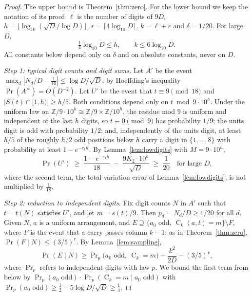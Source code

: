 \documentclass[11pt]{article}
\theoremstyle{definition}
\theoremstyle{remark}
\newcommand{\C}{\operatorname{C}}
\begin{document}
\begin{proof}
The upper bound is Theorem~\ref{thm:zero}. For the lower bound we keep the
notation of its proof: $\ell$ is the number of digits of $9D$,
$h=\lfloor\log_{10}(\sqrt D/\log D)\rfloor$, $r=\lceil4\log_{10}D\rceil$,
$k=\ell+r$ and $\delta=1/20$. For large $D$,
\begin{equation}\label{eq:hk}
  \tfrac14\log_{10}D\le h,\qquad k\le6\log_{10}D .
\end{equation}
All constants below depend only on $\delta$ and on absolute constants, never
on $D$.

\emph{Step 1: typical digit counts and digit sums.} Let $A'$ be the event
$\max_d|N_d/D-\tfrac1{10}|\le\log D/\sqrt D$; by Hoeffding's inequality
$\Pr(A'^c)=O(D^{-2})$. Let $U'$ be the event that $t\equiv9\pmod{18}$ and
$|S(t)\cap[1,h)|\ge h/5$. Both conditions depend only on $t\bmod9\cdot10^h$.
Under the uniform law on $\mathbb Z/9\cdot10^h\cong\mathbb Z/9\times\mathbb Z/10^h$,
the residue mod $9$ is uniform and independent of the last $h$ digits, so
$t\equiv0\pmod9$ has probability $1/9$; the units digit is odd with
probability $1/2$; and, independently of the units digit, at least $h/5$ of
the roughly $h/2$ odd positions below $h$ carry a digit in $\{1,\dots,8\}$
with probability at least $1-e^{-c_1h}$. By Lemma~\ref{lem:lowdigits} with
$M=9\cdot10^h$,
\[
  \Pr(U')\;\ge\;\frac{1-e^{-c_1h}}{18}\;-\;\frac{9K_2\cdot10^h}{\sqrt D}
  \;\ge\;\frac1{20}\quad\text{for large }D,
\]
where the second term, the total-variation error of Lemma~\ref{lem:lowdigits},
is not multiplied by $\frac1{18}$.

\emph{Step 2: reduction to independent digits.} Fix digit counts $N$ in $A'$
such that $t=t(N)$ satisfies $U'$, and let $m=s(t)/9$. Then $p_d=N_d/D\ge1/20$
for all $d$. Given $N$, $a$ is a uniform arrangement, and
$E\supseteq\{a_0\text{ odd},\ \C_k(a,t)=m\}\setminus F$, where $F$ is the
event that a carry passes column $k-1$; as in Theorem~\ref{thm:zero},
$\Pr(F\mid N)\le(3/5)^r$. By Lemma~\ref{lem:sampling},
\begin{equation}\label{eq:reduce}
  \Pr(E\mid N)\ge\Pr\nolimits_p\bigl(a_0\text{ odd},\ \C_k=m\bigr)-\frac{k^2}{2D}-(3/5)^r,
\end{equation}
where $\Pr_p$ refers to independent digits with law $p$. We bound the first
term from below by $\Pr_p(a_0\text{ odd})\cdot\Pr_p(\C_k=m\mid a_0\text{ odd})$
with $\Pr_p(a_0\text{ odd})\ge\tfrac12-5\log D/\sqrt D\ge\tfrac14$.


\end{proof}
\end{document}
